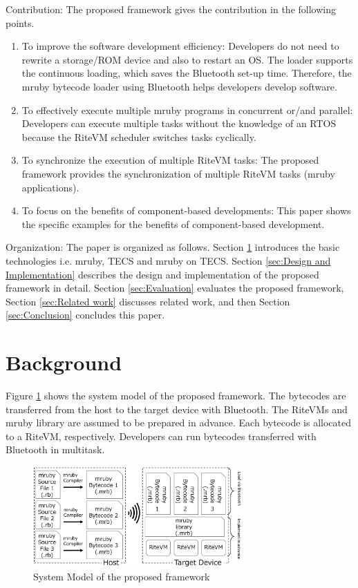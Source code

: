 \documentclass{sig-alternate-05-2015}
\begin{document}
{\mybf Contribution}: The proposed framework gives the contribution in the following points.
\begin{enumerate}
\item {\mybf To improve the software development efficiency:} Developers do not need to rewrite a storage/ROM device and also to restart an OS.
The loader supports the continuous loading, which saves the Bluetooth set-up time.
Therefore, the mruby bytecode loader using Bluetooth helps developers develop software.
\item {\mybf To effectively execute multiple mruby programs in concurrent or/and parallel:} Developers can execute multiple tasks without the knowledge of an RTOS because the RiteVM scheduler switches tasks cyclically.
\item {\mybf To synchronize the execution of multiple RiteVM tasks:} The proposed framework provides the synchronization of multiple RiteVM tasks (mruby applications).
\item {\mybf To focus on the benefits of component-based developments:} This paper shows the specific examples for the benefits of component-based development. 
\end{enumerate}

{\mybf Organization}: The paper is organized as follows.
Section \ref{sec:Background} introduces the basic technologies i.e. mruby, TECS and mruby on TECS.
Section \ref{sec:Design and Implementation} describes the design and implementation of the proposed framework in detail.
Section \ref{sec:Evaluation} evaluates the proposed framework, Section \ref{sec:Related work} discusses related work, and then Section \ref{sec:Conclusion} concludes this paper.

\section{Background}
\label{sec:Background}
Figure \ref{fig:proposed} shows the system model of the proposed framework.
The bytecodes are transferred from the host to the target device with Bluetooth.
The RiteVMs and mruby library are assumed to be prepared in advance.
Each bytecode is allocated to a RiteVM, respectively.
Developers can run bytecodes transferred with Bluetooth in multitask.

\begin{figure}[t]
    \centering
    \includegraphics[width=8cm,clip]{figure/proposed.eps}
    \caption{System Model of the proposed framework}
    \label{fig:proposed}
\end{figure}
\end{document}
